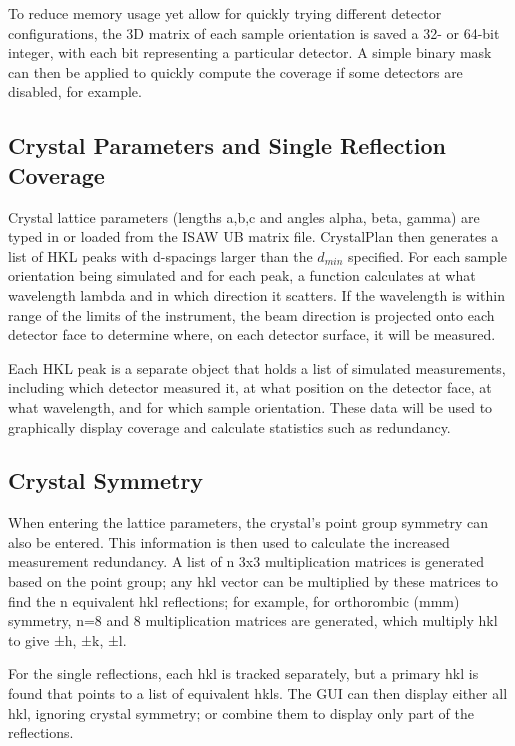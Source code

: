 \documentclass{iucr}              %
\begin{document}
To reduce memory usage yet allow for quickly trying different detector
configurations, the 3D matrix of each sample orientation is saved a 32- or
64-bit integer, with each bit representing a particular detector. A simple
binary mask can then be applied to quickly compute the coverage if some
detectors are disabled, for example.          




\subsection{Crystal Parameters and Single Reflection Coverage}

Crystal lattice parameters (lengths a,b,c and angles alpha, beta, gamma) are
typed in or loaded from the ISAW UB matrix file. CrystalPlan then generates a
list of HKL peaks with d-spacings larger than the $d_{min}$ specified. For each
sample orientation being simulated and for each peak, a function calculates at
what wavelength lambda and in which direction it scatters. If the wavelength is
within range of the limits of the instrument, the beam direction is projected
onto each detector face to determine where, on each detector surface, it will be
measured. 
 
Each HKL peak is a separate object that holds a list of simulated measurements,
including which detector measured it, at what position on the detector face, at
what wavelength, and for which sample orientation. These data will be used to
graphically display coverage and calculate statistics such as redundancy.            



\subsection{Crystal Symmetry}

When entering the lattice parameters, the crystal's point group symmetry can
also be entered. This information is then used to calculate the increased
measurement redundancy. A list of n 3x3 multiplication matrices is generated
based on the point group; any {hkl} vector can be multiplied by these matrices
to find the n equivalent hkl reflections; for example, for orthorombic (mmm)
symmetry, n=8 and 8 multiplication matrices are generated, which multiply {hkl}
to give {±h, ±k, ±l}.              

For the single reflections, each hkl is tracked separately, but a primary hkl is
found that points to a list of equivalent hkls. The GUI can then display either
all hkl, ignoring crystal symmetry; or combine them to display only part of the
reflections.             
\end{document}
